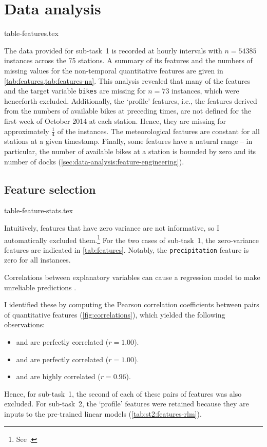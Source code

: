 \documentclass[11pt]{extarticle}
\begin{document}
\section{Data analysis}
\label{sec:data-analysis}

{table-features.tex}

The data provided for sub-task~1 is recorded at hourly intervals with $n = 54385$
instances across the 75 stations.
A summary of its features and the numbers of missing values for the non-temporal
quantitative features are given in \cref{tab:features,tab:features-na}.
This analysis revealed that many of the features and the target variable \texttt{bikes}
are missing for $n = 73$ instances, which were henceforth excluded.
Additionally, the `profile' features, i.e., the features derived from the numbers of
available bikes at preceding times, are not defined for the first week of October 2014
at each station.
Hence, they are missing for approximately $\frac{1}{4}$ of the instances.
The meteorological features are constant for all stations at a given timestamp.
Finally, some features have a natural range -- in particular, the number of available
bikes at a station is bounded by zero and its number of docks
(\cref{sec:data-analysis:feature-engineering}).

\subsection{Feature selection}
\label{sec:data-analysis:feature-selection}

{table-feature-stats.tex}

Intuitively, features that have zero variance are not informative, so I automatically
excluded them.\footnote{See .
}
For the two cases of sub-task~1, the zero-variance features are indicated in
\cref{tab:features}.
Notably, the \texttt{precipitation} feature is zero for all instances.

Correlations between explanatory variables can cause a regression model to make
unreliable predictions \parencite{Alin2010}.
\begin{samepage}
  I identified these by computing the Pearson correlation
  coefficients between pairs of quantitative features (\cref{fig:correlations}), which
  yielded the following observations:
  \begin{itemize}
    \item \texttt{\bikesavgfull} and \texttt{\bikesavgshort} are perfectly correlated ($r = 1.00$).
    \item \texttt{\bikeshdiffavgfull} and \texttt{\bikeshdiffavgshort} are perfectly correlated ($r  = 1.00$).
    \item \texttt{\windspeedmax} and \texttt{\windspeedavg} are highly correlated ($r = 0.96$).
  \end{itemize}
\end{samepage}
Hence, for sub-task~1, the second of each of these pairs of features was also excluded.
For sub-task~2, the `profile' features were retained because they are inputs to the
pre-trained linear models (\cref{tab:st2:features-rlm}).
\end{document}
